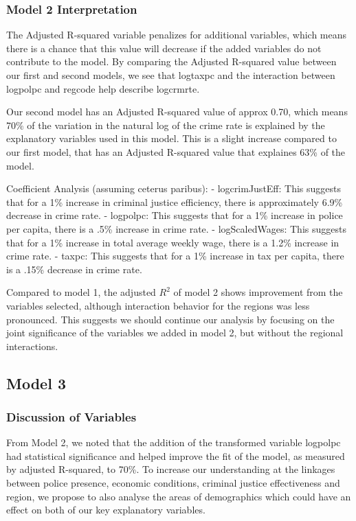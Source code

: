 \documentclass[]{article}
\begin{document}
\hypertarget{model-2-interpretation}{%
\subsubsection{Model 2 Interpretation}\label{model-2-interpretation}}

The Adjusted R-squared variable penalizes for additional variables,
which means there is a chance that this value will decrease if the added
variables do not contribute to the model. By comparing the Adjusted
R-squared value between our first and second models, we see that
logtaxpc and the interaction between logpolpc and regcode help describe
logcrmrte.

Our second model has an Adjusted R-squared value of approx 0.70, which
means 70\% of the variation in the natural log of the crime rate is
explained by the explanatory variables used in this model. This is a
slight increase compared to our first model, that has an Adjusted
R-squared value that explaines 63\% of the model.

Coefficient Analysis (assuming ceterus paribus): - logcrimJustEff: This
suggests that for a 1\% increase in criminal justice efficiency, there
is approximately 6.9\% decrease in crime rate. - logpolpc: This suggests
that for a 1\% increase in police per capita, there is a .5\% increase
in crime rate. - logScaledWages: This suggests that for a 1\% increase
in total average weekly wage, there is a 1.2\% increase in crime rate. -
taxpc: This suggests that for a 1\% increase in tax per capita, there is
a .15\% decrease in crime rate.

Compared to model 1, the adjusted \(R^2\) of model 2 shows improvement
from the variables selected, although interaction behavior for the
regions was less pronounced. This suggests we should continue our
analysis by focusing on the joint significance of the variables we added
in model 2, but without the regional interactions.

\hypertarget{model-3}{%
\subsection{Model 3}\label{model-3}}

\hypertarget{discussion-of-variables}{%
\subsubsection{Discussion of Variables}\label{discussion-of-variables}}

From Model 2, we noted that the addition of the transformed variable
logpolpc had statistical significance and helped improve the fit of the
model, as measured by adjusted R-squared, to 70\%. To increase our
understanding at the linkages between police presence, economic
conditions, criminal justice effectiveness and region, we propose to
also analyse the areas of demographics which could have an effect on
both of our key explanatory variables.
\end{document}

